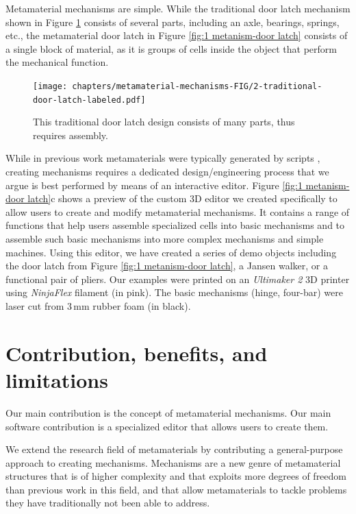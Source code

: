 Metamaterial mechanisms are simple. While the traditional door latch mechanism shown in Figure \ref{fig:2 metanism-traditional door latch} consists of several parts, including an axle, bearings, springs, etc., the metamaterial door latch in Figure \ref{fig:1 metanism-door latch} consists of a single block of material, as it is groups of cells inside the object that perform the mechanical function.

\begin{figure} [h]
    \texttt{[image: chapters/metamaterial-mechanisms-FIG/2-traditional-door-latch-labeled.pdf]}
    \caption[Short figure name.]{This traditional door latch design consists of many parts, thus requires assembly. 
    \label{fig:2 metanism-traditional door latch}}
\end{figure}

While in previous work metamaterials were typically generated by scripts \cite{Mullin2007, Paulose2015}, creating mechanisms requires a dedicated design/engineering process that we argue is best performed by means of an interactive editor. Figure \ref{fig:1 metanism-door latch}c shows a preview of the custom 3D editor we created specifically to allow users to create and modify metamaterial mechanisms. It contains a range of functions that help users assemble specialized cells into basic mechanisms and to assemble such basic mechanisms into more complex mechanisms and simple machines. Using this editor, we have created a series of demo objects including the door latch from Figure \ref{fig:1 metanism-door latch}, a Jansen walker, or a functional pair of pliers. Our examples were printed on an \textit{Ultimaker 2} 3D printer using \textit{NinjaFlex} filament (in pink). The basic mechanisms (hinge, four-bar) were laser cut from $3\, \mathrm{mm}$ rubber foam (in black).


\section{Contribution, benefits, and limitations}

Our main contribution is the concept of metamaterial mechanisms. Our main software contribution is a specialized editor that allows users to create them.

We extend the research field of metamaterials by contributing a general-purpose approach to creating mechanisms. Mechanisms are a new genre of metamaterial structures that is of higher complexity and that exploits more degrees of freedom than previous work in this field, and that allow metamaterials to tackle problems they have traditionally not been able to address. 

